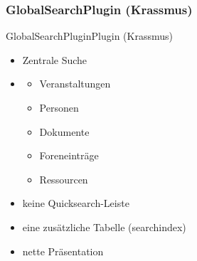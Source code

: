 \documentclass{beamer}
\begin{document}
\subsubsection{GlobalSearchPlugin (Krassmus)}

\begin{frame}{GlobalSearchPlugin}{Plugin (Krassmus)}
    \begin{itemize}
        \item {Zentrale Suche}
        \item[]{%
            \begin{itemize}
                \item{Veranstaltungen}
                \item{Personen}
                \item{Dokumente}
                \item{Foreneinträge}
                \item{Ressourcen\pause}
            \end{itemize}
        }
        \item {keine Quicksearch-Leiste\pause}
        \item {eine zusätzliche Tabelle (searchindex)\pause}
        \item {nette Präsentation}
    \end{itemize}
\end{frame}
\end{document}
